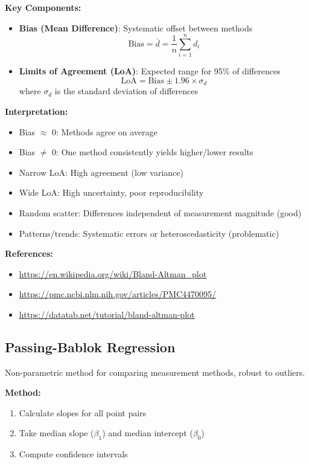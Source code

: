 \documentclass[12pt]{article}
\begin{document}
\textbf{Key Components:}
\begin{itemize}
    \item \textbf{Bias (Mean Difference)}: Systematic offset between methods
    \begin{equation}
        \text{Bias} = \bar{d} = \frac{1}{n}\sum_{i=1}^{n} d_i
    \end{equation}

    \item \textbf{Limits of Agreement (LoA)}: Expected range for 95\% of differences
    \begin{equation}
        \text{LoA} = \text{Bias} \pm 1.96 \times \sigma_d
    \end{equation}
    where $\sigma_d$ is the standard deviation of differences
\end{itemize}

\textbf{Interpretation:}
\begin{itemize}
    \item Bias $\approx$ 0: Methods agree on average
    \item Bias $\neq$ 0: One method consistently yields higher/lower results
    \item Narrow LoA: High agreement (low variance)
    \item Wide LoA: High uncertainty, poor reproducibility
    \item Random scatter: Differences independent of measurement magnitude (good)
    \item Patterns/trends: Systematic errors or heteroscedasticity (problematic)
\end{itemize}

\textbf{References:}
\begin{itemize}
    \item \url{https://en.wikipedia.org/wiki/Bland-Altman_plot}
    \item \url{https://pmc.ncbi.nlm.nih.gov/articles/PMC4470095/}
    \item \url{https://datatab.net/tutorial/bland-altman-plot}
\end{itemize}

\subsection{Passing-Bablok Regression}
Non-parametric method for comparing measurement methods, robust to outliers.

\textbf{Method:}
\begin{enumerate}
    \item Calculate slopes for all point pairs
    \item Take median slope ($\beta_1$) and median intercept ($\beta_0$)
    \item Compute confidence intervals
\end{enumerate}
\end{document}

